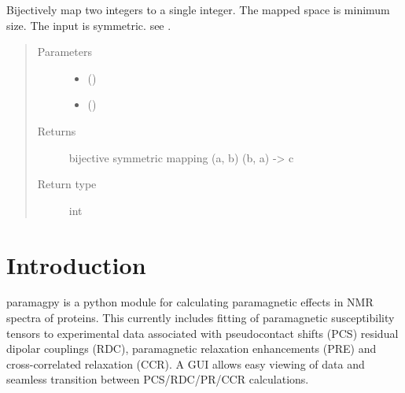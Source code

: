 \documentclass[a4paper,10pt,english]{sphinxmanual}
\begin{document}
\begin{fulllineitems}
\label{\detokenize{reference/generated/paramagpy.fit.unique_pairing:paramagpy.fit.unique_pairing}}
Bijectively map two integers to a single integer.
The mapped space is minimum size.
The input is symmetric.
see .
\begin{quote}\begin{description}
\item[{Parameters}] \leavevmode\begin{itemize}
\item {} 
 () \textendash{} 

\item {} 
 () \textendash{} 

\end{itemize}

\item[{Returns}] \leavevmode
{} \textendash{} bijective symmetric mapping (a, b) \textbar{} (b, a) -\textgreater{} c

\item[{Return type}] \leavevmode
int

\end{description}\end{quote}

\end{fulllineitems}



\chapter{Introduction}
\label{\detokenize{index:introduction}}
paramagpy is a python module for calculating paramagnetic effects in NMR spectra of proteins. This currently includes fitting of paramagnetic susceptibility tensors to experimental data associated with pseudocontact shifts (PCS) residual dipolar couplings (RDC), paramagnetic relaxation enhancements (PRE) and cross-correlated relaxation (CCR). A GUI allows easy viewing of data and seamless transition between PCS/RDC/PR/CCR calculations.
\end{document}
